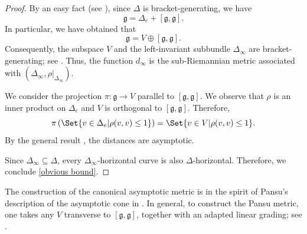 \documentclass[a4paper,11pt,reqno]{amsart}
\theoremstyle{plain}
\theoremstyle{definition}
\newcommand{\g}{\mathfrak{g}}
\newcommand{\id}{e}
\begin{document}
\begin{proof}
 By an easy fact (see \cite[Exercise~10.5.7]{donne2024metricliegroupscarnotcaratheodory}), since $\Delta$ is bracket-generating, we have
 \begin{equation*}
 \g= \Delta_\id + [\g,\g] .
 \end{equation*}
	In particular, we have obtained that 
	\begin{equation} \label{v generates}
	\g = V \oplus [\g,\g].
	\end{equation} Consequently, the subspace $V$ and 
 the left-invariant subbundle $\Delta_\infty$
	are bracket-generating; see \cite[Exercise~10.5.8]{donne2024metricliegroupscarnotcaratheodory}. Thus, the function $d_\infty$ is the sub-Riemannian metric associated with $(\Delta_\infty,\rho|_{\Delta_\infty})$. 

 We consider the projection $\pi \colon \g \to V$ parallel to $[\g,\g]$. We observe that $\rho$ is an inner product on $\Delta_\id$ and $V$ is orthogonal to $[\g,\g]$. Therefore, 
	$$ \pi \left( \Set{v \in \Delta_e | \rho(v,v) \le 1} \right) = \Set{v \in V | \rho(v,v) \le 1}. $$ 
 By the general result \cite[Proposition~3]{MR3153949}, the distances are asymptotic. 

 Since $\Delta_\infty \subseteq \Delta$, every $\Delta_\infty$-horizontal curve is also $\Delta$-horizontal. Therefore, we conclude \eqref{obvious bound}.
\end{proof}

The construction of the canonical asymptotic metric is in the spirit of Pansu's description of the asymptotic cone in \cite{MR741395}. In general, to construct the Pansu metric, one takes any $V$ transverse to $[\g,\g]$, together with an adapted linear grading; see \cite[Section~12.4]{donne2024metricliegroupscarnotcaratheodory}.
\end{document}
